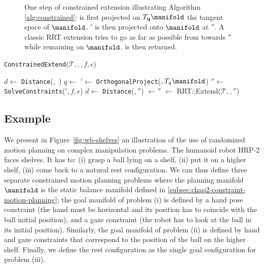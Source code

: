 \begin{figure}
\begin{minipage}[c]{0.3\linewidth}

\end{minipage}

\caption{One step of constrained extension illustrating Algorithm
  \ref{alg:constrained}:  is first projected on
  $T_{\mathbf{q}}\manifold$ the tangent space of
  $\manifold$. $'$ is then projected onto $\manifold$ at
  $''$. A classic RRT extension tries to go as far as
  possible from  towards $''$ while
  remaining on $\manifold$.  is then returned.}
\label{fig:gikrrt}
\end{figure}

\begin{algorithm}
  \caption{\texttt{ConstrainedExtend}($\mathcal{T},$$,$$,f,\epsilon$)}
  \label{alg:constrained}
  \begin{algorithmic}
    \STATE $d \leftarrow$ \texttt{Distance}($,$ )
    \STATE $q \leftarrow$ 
    \STATE {}$' \leftarrow$ \texttt{OrthogonalProject}($, T_q\manifold$)
    \STATE {}$'' \leftarrow$ \texttt{SolveConstraints}($',f,\epsilon$)
    \STATE $d \leftarrow$ \texttt{Distance}(\config{}$,$$''$)
    \STATE \config{}$ \leftarrow $$''$
    \ENDWHILE
    \STATE {}$ \leftarrow$ RRT::Extend($\mathcal{T},$$,$$''$)
  \end{algorithmic}
\end{algorithm}
    
\subsection{Example}

We present in Figure~\ref{fig:wb-shelves} an illustration of the use
of randomized motion planning on complex manipulation problems. The
humanoid robot HRP-2 faces shelves. It has to: (i) grasp a ball lying
on a shelf, (ii) put it on a higher shelf, (iii) come back to a
natural rest configuration. We can thus define three separate
constrained motion planning problems where the planning manifold
$\manifold$ is the static balance manifold defined in
\ref{subsec:chap2-constraint-motion-planning}; the goal manifold of
problem (i) is defined by a hand pose constraint (the hand must be
horizontal and its position has to coincide with the ball initial
position), and a gaze constraint (the robot has to look at the ball in
its initial position). Similarly, the goal manifold of problem (ii) is
defined by hand and gaze constraints that correspond to the position
of the ball on the higher shelf. Finally, we define the rest
configuration as the single goal configuration for problem (iii).

